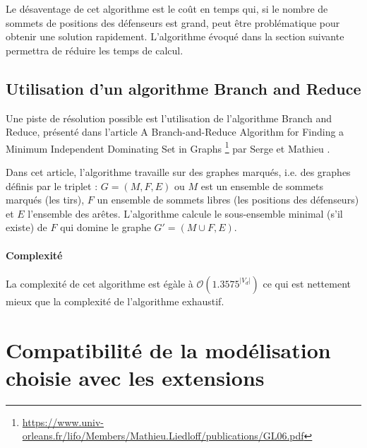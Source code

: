 \documentclass[12pt]{article}
\begin{document}
Le désaventage de cet algorithme est le coût en temps qui, si le nombre de sommets de positions des défenseurs est grand, peut être problématique pour obtenir une solution rapidement. L'algorithme évoqué dans la section suivante permettra de réduire les temps de  calcul.

\subsection{Utilisation d'un algorithme Branch and Reduce}

Une piste de résolution possible est l'utilisation de l'algorithme Branch and Reduce, présenté dans l'article \og{} A Branch-and-Reduce Algorithm for Finding a Minimum Independent Dominating Set in Graphs \fg{}\footnote{\url{https://www.univ-orleans.fr/lifo/Members/Mathieu.Liedloff/publications/GL06.pdf}} par Serge  et Mathieu .

Dans cet article, l'algorithme travaille sur des graphes marqués, i.e. des graphes définis par le triplet : $G = (M, F, E)$ ou $M$ est un ensemble de sommets marqués (les tirs), $F$ un ensemble de sommets libres (les positions des défenseurs) et $E$ l'ensemble des arêtes. L'algorithme calcule le sous-ensemble minimal (s'il existe) de $F$ qui domine le graphe $G' = (M \cup F, E)$.

\paragraph{Complexité} La complexité de cet algorithme est égàle à $\mathcal{O}(1.3575^{|V_d|})$ ce qui est nettement mieux que la complexité de l'algorithme exhaustif.






\section{Compatibilité de la modélisation choisie avec les extensions}
\end{document}
